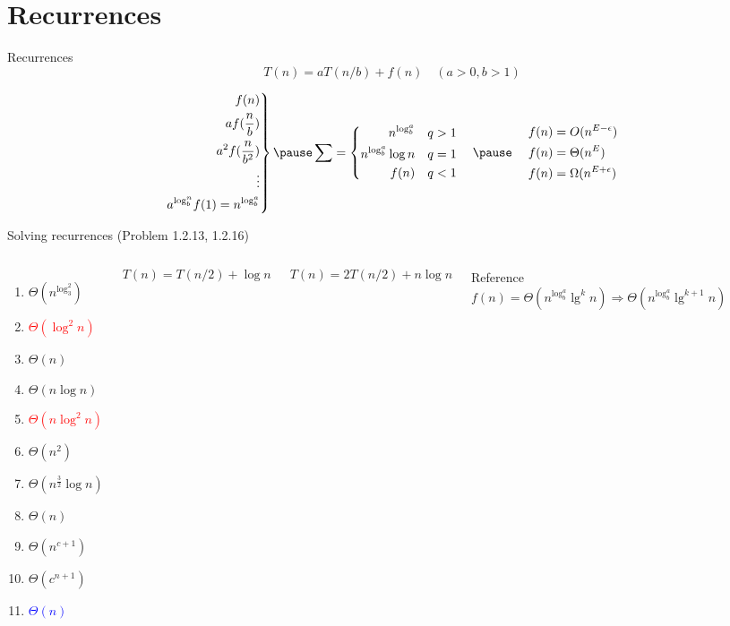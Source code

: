 \section{Recurrences}

\begin{frame}{Recurrences}
  \[
	T(n) = aT(n/b) + f(n) \quad (a > 0, b > 1)
  \]

  \begin{equation*}
	\left.\begin{aligned}
	  f(n) \\
	  af(\frac{n}{b}) \\
	  a^2f(\frac{n}{b^2}) \\
	  \vdots \\
	  a^{\log_b^n}f(1) = n^{\log_b^a}
	\end{aligned}\right\}
	\pause
	\sum = \left\{\begin{aligned}
	  n^{\log_b^a}	\quad & q > 1 \\
	  n^{\log_b^a}\log n \quad & q = 1 \\
	  f(n)	\quad & q < 1 \quad \\
	\end{aligned}\right.
	\pause
	\quad \left.\begin{aligned}
	  f(n) &= O(n^{E-\epsilon}) \\
      f(n) &= \Theta(n^E) \\
      f(n) &= \Omega(n^{E+\epsilon}) 
	\end{aligned}\right.
  \end{equation*}
\end{frame}
\begin{frame}{Solving recurrences (Problem 1.2.13, 1.2.16)}
  \begin{columns}
	  \begin{enumerate}
		\item $\Theta(n^{\log_3^2})$
		\item \textcolor{red}{$\Theta(\log^2 n)$}
		\item $\Theta(n)$
		\item $\Theta(n \log n)$
		\item \textcolor{red}{$\Theta(n \log^2 n)$}
		\item $\Theta(n^2)$
		\item $\Theta(n^{\frac{3}{2}}\log n)$
		\item $\Theta(n)$
		\item $\Theta(n^{c+1})$
		\item $\Theta(c^{n+1})$
		\item \textcolor{blue}{$\Theta(n)$}
	  \end{enumerate}
	  \[
		T(n) = T(n/2) + \log n
	  \]

	  \[
		T(n) = 2T(n/2) + n\log n
	  \]

	\pause
	\begin{alertblock}{Reference}
	  \[
		f(n) = \Theta(n^{\log_b^a} \lg^{k}n) \Rightarrow \Theta(n^{\log_b^a} \lg^{k+1}n)
	  \]
	\end{alertblock}
  \end{columns}
\end{frame}
